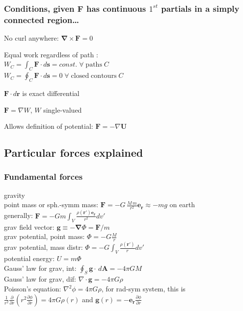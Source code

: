 \documentclass[letterpaper,landscape,10pt]{article}
\newenvironment{mydescription}
{\begin{description}
	\setlength{\itemsep}{0pt}
	\setlength{\parskip}{0pt}
	\setlength{\parsep}{-1pt}}
{\end{description}}
\begin{document}
{\begin{multicols}{4}
	\subsubsection*{Conditions, given $\bm{F}$ has continuous $1^{st}$ partials in a simply connected region\dots}
		\begin{mydescription}
			\item[No curl anywhere:]
				$\bm{\nabla}\times\bm{F}=0$
			\item[Equal work regardless of path]: \\
			  $W_C = \int_{C}\bm{F} \cdot d\bm{s} = const. \;\forall\;\mathrm{paths}\;C$\\
				$W_C = \oint_{C}\bm{F} \cdot d\bm{s} = 0 \;\forall\;\mathrm{closed\;contours}\;C$
			\item[$\bm{F} \cdot d\bm{r}$ is exact differential]
			\item[$\bm{F} = \nabla W$, $W$ single-valued]
			\item[Allows definition of potential:]
			  $\bm{F} = - \nabla \bm{U}$
		\end{mydescription}

	\subsection*{Particular forces explained}
		\subsubsection*{Fundamental forces}
		\begin{mydescription}
			\item[gravity] \  \\
				point mass or sph.-symm mass:
				$\bm{F} = -G \, {\frac{ M \, m}{r^2}}\bm{e_r} \approx -mg$
				on earth \\
				generally:
				$\bm{F} = -Gm \int_V \frac{\rho(\bm{r}')\bm{e_r}}{r^2}dv'$ \\
				grav field vector: $\bm{g} \equiv - \bm{\nabla} \Phi
					= \bm{F}/m$ \\
				grav potential, point mass: $\Phi = -G\frac{M}{r}$\\
				grav potential, mass distr: $\Phi = -G\int_V
					\frac{\rho(\bm{r}')}{r}dv'$\\
				potential energy: $U = m \Phi$\\
				Gauss' law for grav, int: $\oint_S \bm{g}\cdot \, d\bm{A} = -4\pi GM$\\
				Gauss' law for grav, dif: $\nabla \cdot \bm{g}=-4\pi G\rho$\\
				Poisson's equation: $\nabla^2\phi = 4\pi G\rho$, for rad-sym
				system, this is $\frac{1}{r^2}\frac{\partial}{\partial
				r}\left(r^2\frac{\partial\phi}{\partial r}\right) = 4\pi G
				\rho(r)$ and $\bm{g}(r)=-\bm{e_r}
				\frac{\partial\phi}{\partial r}$


\end{mydescription}
\end{multicols}}
\end{document}
